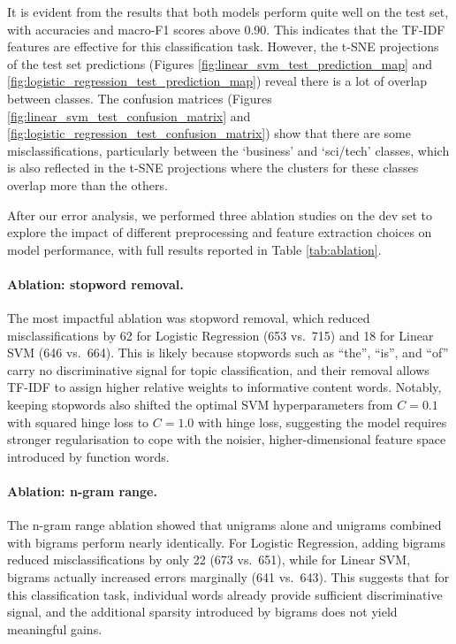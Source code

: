 It is evident from the results that both models perform quite well on the test set, with accuracies and macro-F1 scores above 0.90. This indicates that the TF-IDF features are effective for this classification task. However, the t-SNE projections of the test set predictions (Figures \ref{fig:linear_svm_test_prediction_map} and \ref{fig:logistic_regression_test_prediction_map}) reveal there is a lot of overlap between classes. The confusion matrices (Figures \ref{fig:linear_svm_test_confusion_matrix} and \ref{fig:logistic_regression_test_confusion_matrix}) show that there are some misclassifications, particularly between the `business' and `sci/tech' classes, which is also reflected in the t-SNE projections where the clusters for these classes overlap more than the others.

After our error analysis, we performed three ablation studies on the dev set to explore the impact
of different preprocessing and feature extraction choices on model performance, with full results
reported in Table \ref{tab:ablation}.

\paragraph{Ablation: stopword removal.} The most impactful ablation was stopword removal, which reduced misclassifications by 62 for
Logistic Regression (653 vs.\ 715) and 18 for Linear SVM (646 vs.\ 664). This is likely because
stopwords such as ``the'', ``is'', and ``of'' carry no discriminative signal for topic classification,
and their removal allows TF-IDF to assign higher relative weights to informative content words.
Notably, keeping stopwords also shifted the optimal SVM hyperparameters from $C=0.1$ with
squared hinge loss to $C=1.0$ with hinge loss, suggesting the model requires stronger regularisation
to cope with the noisier, higher-dimensional feature space introduced by function words.

\paragraph{Ablation: n-gram range.} The n-gram range ablation showed that unigrams alone and unigrams combined with bigrams perform
nearly identically. For Logistic Regression, adding bigrams reduced misclassifications by only 22
(673 vs.\ 651), while for Linear SVM, bigrams actually increased errors marginally (641 vs.\ 643).
This suggests that for this classification task, individual words already provide sufficient
discriminative signal, and the additional sparsity introduced by bigrams does not yield meaningful gains.

